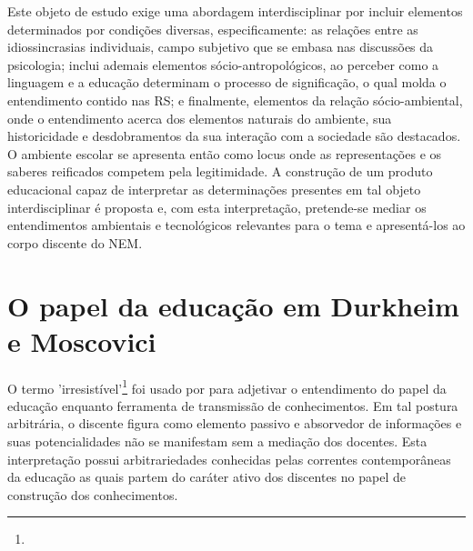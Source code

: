 \documentclass[
  12pt,       %
  openright,      %
  twoside,      %
  a4paper,      %
  english,      %
  french,       %
  spanish,      %
  brazil        %
  ]{abntex2}
\begin{document}
Este objeto de estudo exige uma abordagem interdisciplinar por incluir elementos determinados por condições diversas, especificamente: as relações entre as idiossincrasias individuais, campo subjetivo que se embasa nas discussões da psicologia; inclui ademais elementos sócio-antropológicos, ao perceber como a linguagem e a educação determinam o processo de significação, o qual molda o entendimento contido nas RS; e finalmente, elementos da relação sócio-ambiental, onde o entendimento acerca dos elementos naturais do ambiente, sua historicidade e desdobramentos da sua interação com a sociedade são destacados. O ambiente escolar se apresenta então como locus onde as representações e os saberes reificados competem pela legitimidade. A construção de um produto educacional capaz de interpretar as determinações presentes em tal objeto interdisciplinar é proposta e, com esta interpretação, pretende-se mediar os entendimentos ambientais e tecnológicos relevantes para o tema e apresentá-los ao corpo discente do NEM.




% 


\chapter{O papel da educação em Durkheim e Moscovici}

O termo 'irresistível'\footnote{} foi usado por  para adjetivar o entendimento do papel da educação enquanto ferramenta de transmissão de conhecimentos. Em tal postura arbitrária, o discente figura como elemento passivo e absorvedor de informações e suas potencialidades não se manifestam sem a mediação dos docentes. Esta interpretação possui arbitrariedades conhecidas pelas correntes contemporâneas da educação as quais partem do caráter ativo dos discentes no papel de construção dos conhecimentos.
\end{document}
